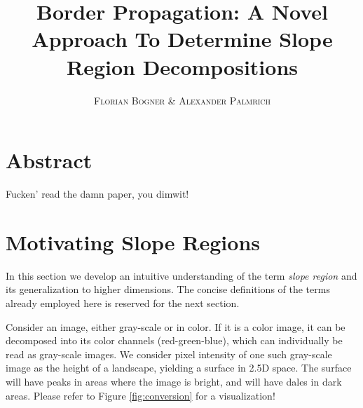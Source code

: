 \documentclass[a4paper,12pt,notitlepage,fullpage]{paper}
\makeatletter
\theoremstyle{plain}
\theoremstyle{definition}
\newcommand*{\toccontents}{\@starttoc{toc}}
\makeatother
\begin{document}
\author{\textsc{Florian Bogner} \& \textsc{Alexander Palmrich}}
\title{Border Propagation: A Novel Approach To Determine Slope Region Decompositions}
\maketitle

\toccontents
%
%
%

\section{Abstract}

Fucken' read the damn paper, you dimwit!





\section{Motivating Slope Regions}
\label{sec:motivating_slope_regions}

In this section we develop an intuitive understanding of the term \emph{slope region} and its generalization to  higher dimensions.
The concise definitions of the terms already employed here is reserved for the next section.

Consider an image, either gray-scale or in color.
If it is a color image, it can be decomposed into its color channels (red-green-blue), which can individually be read as gray-scale images.
We consider pixel intensity of one such gray-scale image as the height of a landscape, yielding a surface in 2.5D space.
The surface will have peaks in areas where the image is bright, and will have dales in dark areas.
Please refer to Figure \ref{fig:conversion} for a visualization!
\end{document}

